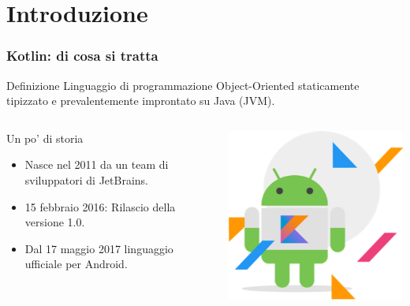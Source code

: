     \section{Introduzione}
    \begin{frame}
      \frametitle{Kotlin: di cosa si tratta}
        \begin{block}{Definizione}
          Linguaggio di programmazione Object-Oriented \alert{staticamente tipizzato} e
          prevalentemente improntato su Java (JVM).
        \end{block}

        \bigskip
        \begin{columns}
          \begin{column}{0.47\textwidth}

          \begin{block}{Un po' di storia}
            \begin{itemize}[<+->]
              \item Nasce nel 2011 da un team di sviluppatori di JetBrains.
              \item 15 febbraio 2016: Rilascio della versione 1.0.
              \item Dal 17 maggio 2017 linguaggio \alert{ufficiale} per Android.
            \end{itemize}
          \end{block}
          \end{column}
          \begin{column}{0.5\textwidth}
            \begin{center}
              \includegraphics[scale=0.35]{android-and-kotlin}
            \end{center}
          \end{column}
        \end{columns}

    \end{frame}

